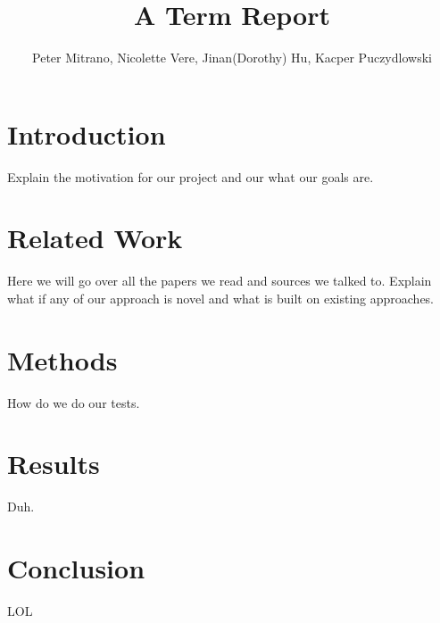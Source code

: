 \documentclass{article}
\begin{document}
\title{A Term Report}
\author{Peter Mitrano, Nicolette Vere, Jinan(Dorothy) Hu, Kacper Puczydlowski}

\maketitle{}

\section{Introduction}

Explain the motivation for our project and our what our goals are.

\section{Related Work}

Here we will go over all the papers we read and sources we talked to. Explain what if any of our approach is novel and what is built on existing approaches.

\section{Methods}

How do we do our tests.

\section{Results}

Duh.

\section{Conclusion}
LOL
\end{document}
